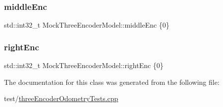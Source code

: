 \subsubsection{\texorpdfstring{middleEnc}{middleEnc}}
{\footnotesize\ttfamily std\+::int32\+\_\+t Mock\+Three\+Encoder\+Model\+::middle\+Enc \{0\}}

\mbox{\label{classMockThreeEncoderModel_ab2c750607e68aed5a19571dec3564163}} 
\subsubsection{\texorpdfstring{rightEnc}{rightEnc}}
{\footnotesize\ttfamily std\+::int32\+\_\+t Mock\+Three\+Encoder\+Model\+::right\+Enc \{0\}}



The documentation for this class was generated from the following file\+:\begin{DoxyCompactItemize}
\item 
test/\mbox{\hyperlink{threeEncoderOdometryTests_8cpp}{three\+Encoder\+Odometry\+Tests.\+cpp}}\end{DoxyCompactItemize}

